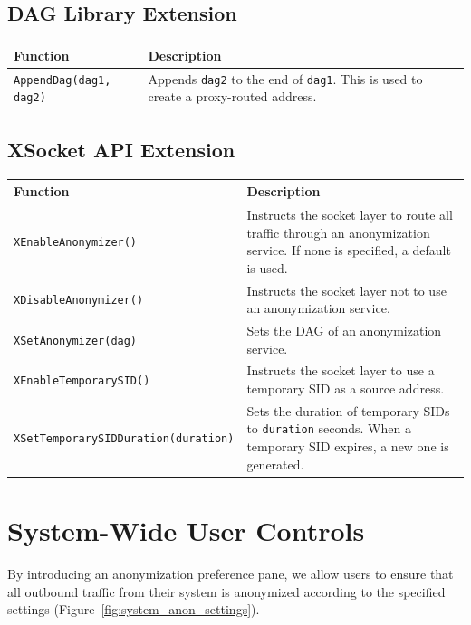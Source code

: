 \documentclass[11pt]{article}
\begin{document}
\subsection{DAG Library Extension}

\begin{center}
	\begin{tabular}{l p{7cm}}
	\textbf{Function} 	&	\textbf{Description}\\
	\hline
	\texttt{AppendDag(dag1, dag2)} & Appends \texttt{dag2} to the end of \texttt{dag1}.  This is used to create a proxy-routed address. \\ \hline
	\end{tabular}
\end{center}

\subsection{XSocket API Extension}
\label{sec:api-interface}

\begin{center}
	\begin{tabular}{l p{7cm}}
	\textbf{Function} 	&	\textbf{Description}\\
	\hline
	\texttt{XEnableAnonymizer()} & Instructs the socket layer to route all traffic through an anonymization service. If none is specified, a default is used.\\
	\texttt{XDisableAnonymizer()} & Instructs the socket layer not to use an anonymization service.\\
	\texttt{XSetAnonymizer(dag)} & Sets the DAG of an anonymization service.\\
	\texttt{XEnableTemporarySID()} & Instructs the socket layer to use a temporary SID as a source address.\\
	\texttt{XSetTemporarySIDDuration(duration)} & Sets the duration of temporary SIDs to \texttt{duration} seconds. When a temporary SID expires, a new one is generated.\\
	\hline
	\end{tabular}
\end{center}

\section{System-Wide User Controls}
By introducing an anonymization preference pane, we allow users to ensure that all outbound traffic from their system is anonymized according to the specified settings (Figure~\ref{fig:system_anon_settings}).
\end{document}
